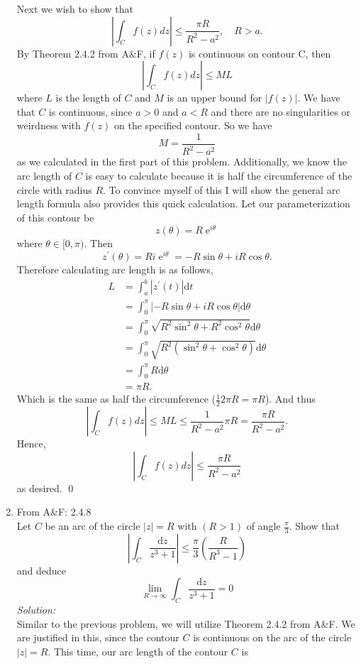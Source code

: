 \documentclass[10pt]{amsart}
\newcommand{\D}{\mathrm{d}}
\DeclareMathOperator{\E}{e}
\theoremstyle{nonumberplain}
\begin{document}
\begin{enumerate}[label={\bf {\arabic*}:}]
\noindent
Next we wish to show that 
$$
\left| \int_C f(z) dz \right| \leq \frac{\pi R}{R^2 - a^2}, \quad R > a.
$$
By Theorem 2.4.2 from A\&F, if $f(z)$ is continuous on contour C, then
$$
\left| \int_C f(z) dz \right| \leq ML
$$
where $L$ is the length of $C$ and $M$ is an upper bound for $\left| f(z) \right|$.
We have that $C$ is continuous, since $a >0$ and $a < R$ and there are no singularities or weirdness with $f(z)$ on the specified contour.
So we have 
$$
M = \frac{1}{R^2 - a^2}
$$
as we calculated in the first part of this problem.
Additionally, we know the arc length of $C$ is easy to calculate because it is half the circumference of the circle with radius $R$.
To convince myself of this I will show the general arc length formula also provides this quick calculation.
Let our parameterization of this contour be $$z(\theta) = R\E^{i\theta}$$ where $\theta \in [0, \pi)$. Then $$z^\prime(\theta) = Ri\E^{i\theta} = -R\sin\theta + iR\cos\theta.$$
Therefore calculating arc length is as follows,
\begin{align*}
L &= \int_a^b |z^\prime(t)| \D t \\
	&= \int_{0}^{\pi} \left| -R\sin\theta + iR\cos\theta \right| \D \theta \\
	&= \int_{0}^{\pi} \sqrt{ R^2\sin^2\theta + R^2\cos^2\theta } \D \theta \\
	&= \int_{0}^{\pi} \sqrt{ R^2\left(\sin^2\theta + \cos^2\theta\right) } \D \theta \\
	&= \int_{0}^{\pi} R \D \theta \\
	&= \pi R.
\end{align*}
Which is the same as half the circumference ($\frac 1 2 2\pi R = \pi R$).
And thus
$$
\left| \int_C f(z) dz \right| \leq ML \leq \frac{1}{R^2 - a^2} \pi R = \frac{\pi R}{R^2 - a^2}.
$$
Hence, 
$$
\left| \int_C f(z) dz \right| \leq \frac{\pi R}{R^2 - a^2}
$$
as desired.
\qed
\\
\item From A\&F: 2.4.8 \\
Let $C$ be an arc of the circle $\left|z\right| = R$ with $(R > 1)$ of angle $\frac{\pi}{3}$.
Show that 
$$
\left| \int_C \frac{\D z}{z^3 + 1} \right| \leq \frac \pi 3 \left( \frac{R}{R^3 - 1} \right)
$$
and deduce
$$
\lim_{R \rightarrow \infty} \int_C \frac{\D z}{z^3 + 1} = 0
$$
\textit{Solution:} \\
Similar to the previous problem, we will utilize Theorem 2.4.2 from A\&F.
We are justified in this, since the contour $C$ is continuous on the arc of the circle $|z| = R$.
This time, our arc length of the contour $C$ is

\end{enumerate}
\end{document}

